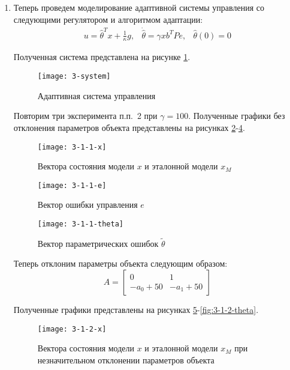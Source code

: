 \documentclass[14pt, a4paper]{extarticle}
\begin{document}
\begin{enumerate}
		\item Теперь проведем моделирование адаптивной системы управления со следующими регулятором и алгоритмом адаптации:
		$$\begin{matrix}
			u=\hat{\theta}^Tx+\frac{1}{\kappa}g, & \dot{\hat{\theta}}=\gamma x b^TPe, & \hat{\theta}(0)=0
		\end{matrix}$$
		
		Полученная система представлена на рисунке \ref{fig:3-system}.
		
		\begin{figure}[H]
			\centering
			\texttt{[image: 3-system]}
			\caption{Адаптивная система управления}
			\label{fig:3-system}
		\end{figure}
		
		Повторим три эксперимента п.п.~2 при $\gamma=100$. Полученные графики без отклонения параметров объекта представлены на рисунках \ref{fig:3-1-1-x}-\ref{fig:3-1-1-theta}. 
		
		\begin{figure}[H]
			\centering
			\texttt{[image: 3-1-1-x]}
			\caption{Вектора состояния модели $x$ и эталонной модели $x_M$}
			\label{fig:3-1-1-x}
		\end{figure}
		
		\begin{figure}[H]
			\centering
			\texttt{[image: 3-1-1-e]}
			\caption{Вектор ошибки управления $e$}
			\label{fig:3-1-1-e}
		\end{figure}
		
		\begin{figure}[H]
			\centering
			\texttt{[image: 3-1-1-theta]}
			\caption{Вектор параметрических ошибок $\tilde{\theta}$}
			\label{fig:3-1-1-theta}
		\end{figure}
		
		Теперь отклоним параметры объекта следующим образом:
		$$A=\left[
		\begin{matrix}
			0 & 1 \\
			-a_0+50 & -a_1+50 
		\end{matrix}
		\right]$$
		
		Полученные графики представлены на рисунках \ref{fig:3-1-2-x}-\ref{fig:3-1-2-theta}. 
		
		\begin{figure}[H]
			\centering
			\texttt{[image: 3-1-2-x]}
			\caption{Вектора состояния модели $x$ и эталонной модели $x_M$ при незначительном отклонении параметров объекта}
			\label{fig:3-1-2-x}
		\end{figure}
		

\end{enumerate}
\end{document}
